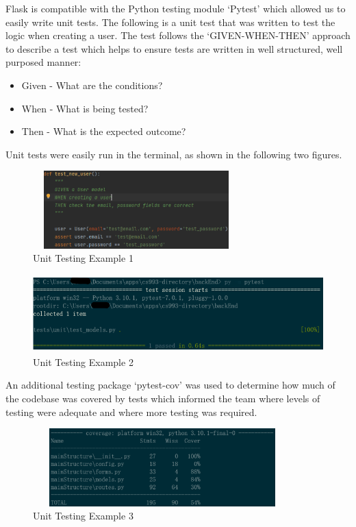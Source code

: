 \documentclass[11pt, english]{article}
\begin{document}
Flask is compatible with the Python testing module `Pytest' which allowed us to easily write unit tests. The following is a unit test that was written to test the logic when creating a user. The test follows the `GIVEN-WHEN-THEN' approach to describe a test which helps to ensure tests are written in well structured, well purposed manner:
		
	\begin{itemize}
	\setlength\itemsep{0cm}
		\item Given - What are the conditions?
		\item When - What is being tested?
		\item Then - What is the expected outcome?
	\end{itemize}

	Unit tests were easily run in the terminal, as shown in the following two figures.

	\begin{figure}[H]
	\begin{center}
		\includegraphics[width=8cm,height=3cm]{CS993_IMG/Testing1.png}
		\caption{Unit Testing Example 1}
	\end{center}
	\end{figure}

	\begin{figure}[H]
	\begin{center}
		\includegraphics[width=12cm,height=3cm]{CS993_IMG/Testing2.png}
		\caption{Unit Testing Example 2}
	\end{center}
	\end{figure}

	An additional testing package `pytest-cov' was used to determine how much of the codebase was covered by tests which informed the team where levels of testing were adequate and where more testing was required.

	\begin{figure}[H]
	\begin{center}
		\includegraphics[width=10cm,height=3cm]{CS993_IMG/Testing3.png}
		\caption{Unit Testing Example 3}
	\end{center}
	\end{figure}
\end{document}
